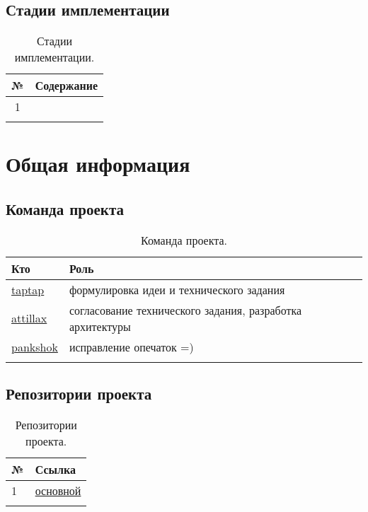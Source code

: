 \documentclass[12pt,a4paper,fullpage,titlepage]{article}
\begin{document}
\subsection{Стадии имплементации}

\begin{table}[h]
\begin{tabularx}{\textwidth}{|c|X|}
	\hline
	№ & Содержание\\
	\hline
	1 & \\
	\hline
	& \\
	\hline
\end{tabularx}
\caption{Стадии имплементации.}
\end{table}

\newpage
\section{Общая информация}
\subsection{Команда проекта}
\begin{table}[h]
	\begin{tabularx}{\textwidth}{|l|X|}
		\hline
		Кто & Роль \\
		\hline
		\href{https://github.com/taptap/}{taptap} & формулировка идеи и технического задания\\
		\hline
		\href{https://github.com/attillax}{attillax} & согласование технического задания, разработка архитектуры\\
		\hline
		\href{https://github.com/pankshok}{pankshok} & исправление опечаток =)\\
		\hline
		& \\
		\hline
	\end{tabularx}
	\caption{Команда проекта.}
\end{table}

\subsection{Репозитории проекта}
\begin{table}[h]
	\begin{tabularx}{\textwidth}{|l|X|}
		\hline
		№ & Ссылка \\
		\hline
		1 & \href{https://github.com/taptap/ladders}{основной} \\
		\hline
		& \\
		\hline
	\end{tabularx}
	\caption{Репозитории проекта.}
\end{table}
\end{document}
